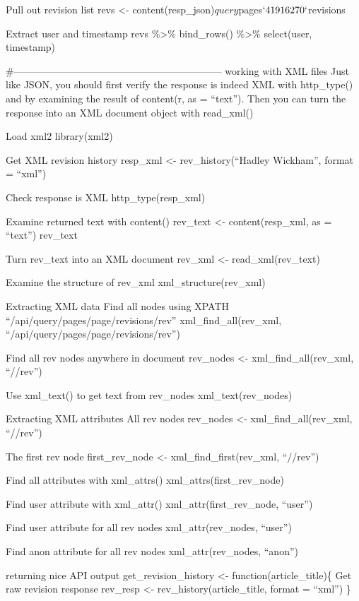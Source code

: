 \documentclass[]{book}
\begin{document}
Pull out revision list
revs \textless{}- content(resp\_json)\(query\)pages\(`41916270`\)revisions

Extract user and timestamp
revs \%\textgreater{}\%
bind\_rows() \%\textgreater{}\%
select(user, timestamp)

\#---------------------------------------------------------------
working with XML files
Just like JSON, you should first verify the response is indeed XML with http\_type()
and by examining the result of content(r, as = ``text'').
Then you can turn the response into an XML document object with read\_xml()

Load xml2
library(xml2)

Get XML revision history
resp\_xml \textless{}- rev\_history(``Hadley Wickham'', format = ``xml'')

Check response is XML
http\_type(resp\_xml)

Examine returned text with content()
rev\_text \textless{}- content(resp\_xml, as = ``text'')
rev\_text

Turn rev\_text into an XML document
rev\_xml \textless{}- read\_xml(rev\_text)

Examine the structure of rev\_xml
xml\_structure(rev\_xml)

Extracting XML data
Find all nodes using XPATH ``/api/query/pages/page/revisions/rev''
xml\_find\_all(rev\_xml, ``/api/query/pages/page/revisions/rev'')

Find all rev nodes anywhere in document
rev\_nodes \textless{}- xml\_find\_all(rev\_xml, ``//rev'')

Use xml\_text() to get text from rev\_nodes
xml\_text(rev\_nodes)

Extracting XML attributes
All rev nodes
rev\_nodes \textless{}- xml\_find\_all(rev\_xml, ``//rev'')

The first rev node
first\_rev\_node \textless{}- xml\_find\_first(rev\_xml, ``//rev'')

Find all attributes with xml\_attrs()
xml\_attrs(first\_rev\_node)

Find user attribute with xml\_attr()
xml\_attr(first\_rev\_node, ``user'')

Find user attribute for all rev nodes
xml\_attr(rev\_nodes, ``user'')

Find anon attribute for all rev nodes
xml\_attr(rev\_nodes, ``anon'')

returning nice API output
get\_revision\_history \textless{}- function(article\_title)\{
Get raw revision response
rev\_resp \textless{}- rev\_history(article\_title, format = ``xml'') \}
\end{document}

